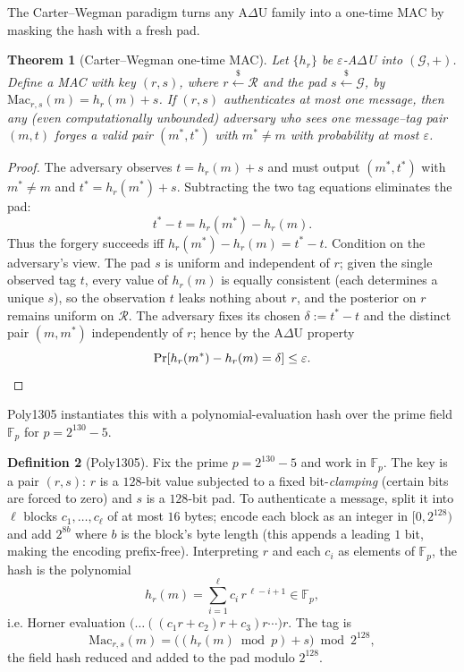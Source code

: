 \documentclass[11pt,a4paper]{article}
\newtheorem{theorem}{Theorem}[section]
\theoremstyle{definition}
\newtheorem{definition}[theorem]{Definition}
\theoremstyle{remark}
\newcommand{\Fp}{\ensuremath{\mathbb{F}_{p}}}
\begin{document}
The Carter--Wegman paradigm turns any A\(\Delta\)U family into a one-time MAC by masking the hash with a fresh pad.

\begin{theorem}[Carter--Wegman one-time MAC]\label{symmetric:thm-cw}
Let \(\{h_r\}\) be \(\varepsilon\)-A\(\Delta\)U into \((\mathcal{G}, +)\). Define a MAC with key \((r, s)\), where \(r \xleftarrow{\$}\mathcal{R}\) and the pad \(s \xleftarrow{\$}\mathcal{G}\), by \(\mathrm{Mac}_{r,s}(m) = h_r(m) + s\). If \((r,s)\) authenticates at most one message, then any (even computationally unbounded) adversary who sees one message--tag pair \((m, t)\) forges a valid pair \((m^\ast, t^\ast)\) with \(m^\ast \ne m\) with probability at most \(\varepsilon\).
\end{theorem}

\begin{proof}
The adversary observes \(t = h_r(m) + s\) and must output \((m^\ast, t^\ast)\) with \(m^\ast \ne m\) and \(t^\ast = h_r(m^\ast) + s\). Subtracting the two tag equations eliminates the pad:
\[
  t^\ast - t = h_r(m^\ast) - h_r(m).
\]
Thus the forgery succeeds iff \(h_r(m^\ast) - h_r(m) = t^\ast - t\). Condition on the adversary's view. The pad \(s\) is uniform and independent of \(r\); given the single observed tag \(t\), every value of \(h_r(m)\) is equally consistent (each determines a unique \(s\)), so the observation \(t\) leaks nothing about \(r\), and the posterior on \(r\) remains uniform on \(\mathcal{R}\). The adversary fixes its chosen \(\delta := t^\ast - t\) and the distinct pair \((m, m^\ast)\) independently of \(r\); hence by the A\(\Delta\)U property
\[
  \Pr[h_r(m^\ast) - h_r(m) = \delta] \le \varepsilon. \qedhere
\]
\end{proof}

\textsf{Poly1305} instantiates this with a polynomial-evaluation hash over the prime field \(\Fp\) for \(p = 2^{130} - 5\).

\begin{definition}[Poly1305]\label{symmetric:def-poly1305}
Fix the prime \(p = 2^{130} - 5\) and work in \(\Fp\). The key is a pair \((r, s)\): \(r\) is a \(128\)-bit value subjected to a fixed bit-\emph{clamping} (certain bits are forced to zero) and \(s\) is a \(128\)-bit pad. To authenticate a message, split it into \(\ell\) blocks \(c_1, \dots, c_\ell\) of at most \(16\) bytes; encode each block as an integer in \([0, 2^{128})\) and add \(2^{8b}\) where \(b\) is the block's byte length (this appends a leading \(1\) bit, making the encoding prefix-free). Interpreting \(r\) and each \(c_i\) as elements of \(\Fp\), the hash is the polynomial
\[
  h_r(m) = \sum_{i=1}^{\ell} c_i\, r^{\,\ell - i + 1} \in \Fp,
\]
i.e. Horner evaluation \(\bigl(\dots((c_1 r + c_2) r + c_3) r \cdots\bigr) r\). The tag is
\[
  \mathrm{Mac}_{r,s}(m) = \bigl( (h_r(m) \bmod p) + s \bigr) \bmod 2^{128},
\]
the field hash reduced and added to the pad modulo \(2^{128}\).
\end{definition}
\end{document}

